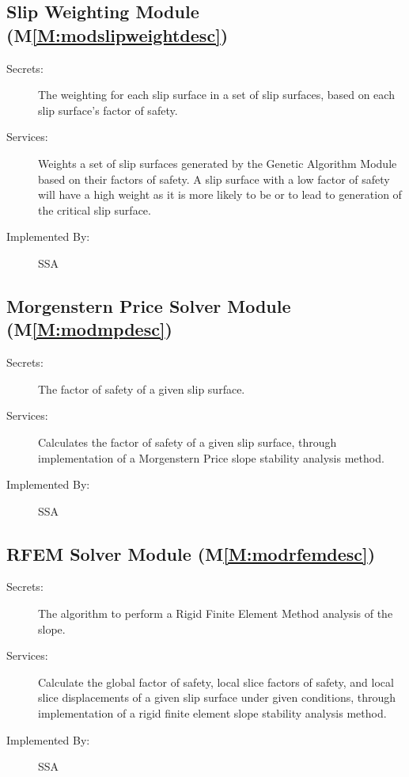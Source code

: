 \documentclass[12pt]{article}
\begin{document}
\subsection{Slip Weighting Module (M\ref{M:modslipweightdesc})}
\label{Sec:SlipWeigModu()}
\begin{description}
\item[Secrets:]The weighting for each slip surface in a set of slip surfaces, based on each slip surface's factor of safety.
\item[Services:]Weights a set of slip surfaces generated by the Genetic Algorithm Module based on their factors of safety. A slip surface with a low factor of safety will have a high weight as it is more likely to be or to lead to generation of the critical slip surface.
\item[Implemented By:]SSA
\end{description}
\subsection{Morgenstern Price Solver Module (M\ref{M:modmpdesc})}
\label{Sec:MorgPricSolvModu()}
\begin{description}
\item[Secrets:]The factor of safety of a given slip surface.
\item[Services:]Calculates the factor of safety of a given slip surface, through implementation of a Morgenstern Price slope stability analysis method.
\item[Implemented By:]SSA
\end{description}
\subsection{RFEM Solver Module (M\ref{M:modrfemdesc})}
\label{Sec:RFEMSolvModu()}
\begin{description}
\item[Secrets:]The algorithm to perform a Rigid Finite Element Method analysis of the slope.
\item[Services:]Calculate the global factor of safety, local slice factors of safety, and local slice displacements of a given slip surface under given conditions, through implementation of a rigid finite element slope stability analysis method.
\item[Implemented By:]SSA
\end{description}
\end{document}

